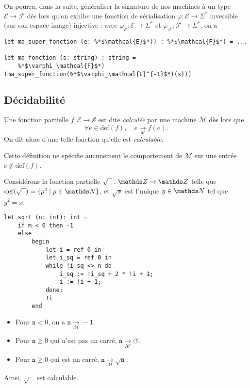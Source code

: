 \begin{rmk}
	On pourra, dans la suite, généraliser la signature de nos machines à un type $\mathcal{E} \to \mathcal{F}$\/ dès lors qu'on exhibe une fonction de sérialisation $\varphi : \mathcal{E} \to \Sigma^*$\/ inversible (sur son espace image) injective : avec $\varphi_\mathcal{E} : \mathcal{E} \to \Sigma^*$\/ et $\varphi_\mathcal{F} : \mathcal{F} \to \Sigma^*$, on a 
	\begin{lstlisting}[language=caml,caption=Généralisation des machines ayant pour entrée un ensemble $\mathcal{E}$\/ et sortie $\mathcal{F}$]
let ma_super_fonction (e: %*$\mathcal{E}$*)) : %*$\mathcal{F}$*) = ...

let ma_fonction (s: string) : string =
	%*$\varphi_\mathcal{F}$*)(ma_super_fonction(%*$\varphi_\mathcal{E}^{-1}$*)(s)))
	\end{lstlisting}
\end{rmk}


\subsection{Décidabilité}

\begin{defn}
	Une fonction partielle $f : \mathcal{E} \to \mathcal{S}$\/ est dite \textit{calculée} par une machine $\mathcal{M}$\/ dès lors que \[
		\forall e \in \mathrm{def}(f),\quad e \xrightarrow[\mathcal{M}]{} f(e)
	.\] On dit alors d'une telle fonction qu'elle est \textit{calculable}.
\end{defn}

\begin{rmk}
	Cette définition ne spécifie aucunement le comportement de $\mathcal{M}$\/ sur une entrée $e \not\in \mathrm{def}(f)$.
\end{rmk}

\begin{exm}
	Considérons la fonction partielle $\sqrt{\phantom{x}} : \Z \to \Z$\/ telle que $\mathrm{def}(\sqrt{\phantom{x}}) = \{p^2  \mid p \in \N\}$, et $\sqrt{x}$\/ est l'unique $y \in \N$\/ tel que $y^2 = x$.
	\begin{lstlisting}[language=caml,caption=Machine calculant la fonction $\sqrt{\phantom{x}}$]
let sqrt (n: int): int =
	if m < 0 then -1
	else
		begin
			let i = ref 0 in
			let i_sq = ref 0 in
			while !i_sq <> n do
				i_sq := !i_sq + 2 * !i + 1;
				i := !i + 1;
			done;
			!i
		end
	\end{lstlisting}
	\begin{itemize}
		\item Pour $\mathtt{n} < 0$, on a $\mathtt{n} \xrightarrow[\mathcal{M}]{} -1$.
		\item Pour $\mathtt{n} \ge 0$\/ qui n'est pas un carré, $\mathtt{n} \xrightarrow[\mathcal{M}]{} {\circlearrowleft}$.
		\item Pour $\mathtt{n} \ge 0$\/ qui est un carré, $\mathtt{n} \xrightarrow[\mathcal{M}]{} \sqrt{\mathtt{n}}$.
	\end{itemize}
	Ainsi, $\sqrt{\phantom{x}}$\/ est calculable.
\end{exm}

